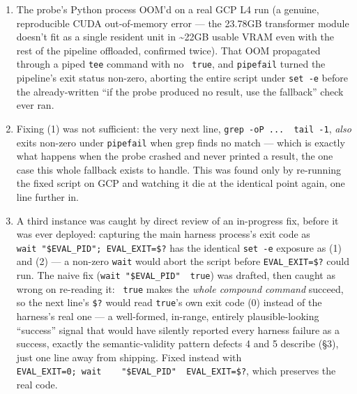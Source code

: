 \begin{enumerate}
\def\labelenumi{\arabic{enumi}.}
\tightlist
\item
  The probe's Python process OOM'd on a real GCP L4 run (a genuine,
  reproducible CUDA out-of-memory error --- the 23.78GB transformer
  module doesn't fit as a single resident unit in \textasciitilde22GB
  usable VRAM even with the rest of the pipeline offloaded, confirmed
  twice). That OOM propagated through a piped \texttt{tee} command with
  no \texttt{\textbar{}\textbar{}\ true}, and \texttt{pipefail} turned
  the pipeline's exit status non-zero, aborting the entire script under
  \texttt{set\ -e} before the already-written ``if the probe produced no
  result, use the fallback'' check ever ran.
\item
  Fixing (1) was not sufficient: the very next line,
  \texttt{grep\ -oP\ \textquotesingle{}...\textquotesingle{}\ \textbar{}\ tail\ -1},
  \emph{also} exits non-zero under \texttt{pipefail} when grep finds no
  match --- which is exactly what happens when the probe crashed and
  never printed a result, the one case this whole fallback exists to
  handle. This was found only by re-running the fixed script on GCP and
  watching it die at the identical point again, one line further in.
\item
  A third instance was caught by direct review of an in-progress fix,
  before it was ever deployed: capturing the main harness process's exit
  code as \texttt{wait\ "\$EVAL\_PID";\ EVAL\_EXIT=\$?} has the
  identical \texttt{set\ -e} exposure as (1) and (2) --- a non-zero
  \texttt{wait} would abort the script before \texttt{EVAL\_EXIT=\$?}
  could run. The naive fix
  (\texttt{wait\ "\$EVAL\_PID"\ \textbar{}\textbar{}\ true}) was
  drafted, then caught as wrong on re-reading it:
  \texttt{\textbar{}\textbar{}\ true} makes the \emph{whole compound
  command} succeed, so the next line's \texttt{\$?} would read
  \texttt{true}'s own exit code (0) instead of the harness's real one
  --- a well-formed, in-range, entirely plausible-looking ``success''
  signal that would have silently reported every harness failure as a
  success, exactly the semantic-validity pattern defects 4 and 5
  describe (§3), just one line away from shipping. Fixed instead with
  \texttt{EVAL\_EXIT=0;\ wait\ \ \ \ "\$EVAL\_PID"\ \textbar{}\textbar{}\ EVAL\_EXIT=\$?},
  which preserves the real code.
\end{enumerate}

